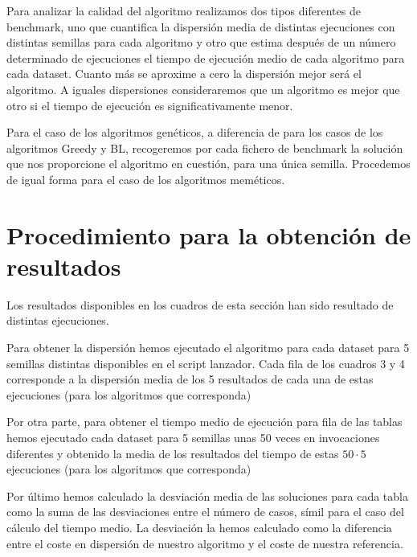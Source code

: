 Para analizar la calidad del algoritmo realizamos dos tipos diferentes de benchmark, uno que cuantifica la dispersión
media de distintas ejecuciones con distintas semillas para cada algoritmo y otro que estima después de un número
determinado de ejecuciones el tiempo de ejecución medio de cada algoritmo para cada dataset. Cuanto más se aproxime
a cero la dispersión mejor será el algoritmo. A iguales dispersiones consideraremos que un algoritmo es mejor que otro
si el tiempo de ejecución es significativamente menor.

Para el caso de los algoritmos genéticos, a diferencia de para los casos de los algoritmos Greedy y BL, recogeremos 
por cada fichero de benchmark la solución que nos proporcione el algoritmo en cuestión, para una única semilla. Procedemos
de igual forma para el caso de los algoritmos meméticos.

\begin{minipage}{\textwidth}
    \section{Procedimiento para la obtención de resultados}
    
    Los resultados disponibles en los cuadros de esta sección han sido resultado de distintas ejecuciones.
    
    Para obtener la dispersión hemos ejecutado el algoritmo para cada dataset para 5 semillas distintas disponibles
    en el script lanzador. Cada fila de los cuadros 3 y 4 corresponde a la dispersión media de los 5 resultados de cada
    una de estas ejecuciones (para los algoritmos que corresponda)
    
    Por otra parte, para obtener el tiempo medio de ejecución para fila de las tablas hemos ejecutado cada dataset
    para 5 semillas unas 50 veces en invocaciones diferentes y obtenido la media de los resultados del tiempo de estas
    $ 50 \cdot 5 $ ejecuciones (para los algoritmos que corresponda)
    
    Por último hemos calculado la desviación media de las soluciones para cada tabla como la suma de las desviaciones
    entre el número de casos, símil para el caso del cálculo del tiempo medio. La desviación la hemos calculado como la
    diferencia entre el coste en dispersión de nuestro algoritmo y el coste de nuestra referencia.
    
\end{minipage}




